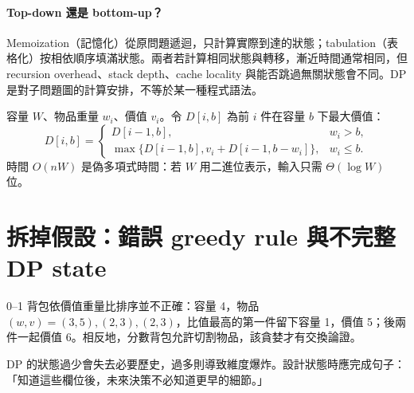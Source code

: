 \documentclass[11pt,a4paper,oneside,openany]{book}
\begin{document}
\paragraph{Top-down 還是 bottom-up？}
Memoization（記憶化）從原問題遞迴，只計算實際到達的狀態；tabulation（表格化）按相依順序填滿狀態。兩者若計算相同狀態與轉移，漸近時間通常相同，但 recursion overhead、stack depth、cache locality 與能否跳過無關狀態會不同。DP 是對子問題圖的計算安排，不等於某一種程式語法。

\begin{example}[0--1 背包]
容量 $W$、物品重量 $w_i$、價值 $v_i$。令 $D[i,b]$ 為前 $i$ 件在容量 $b$ 下最大價值：
\[
 D[i,b]=\begin{cases}
 D[i-1,b],&w_i>b,\\
 \max\{D[i-1,b],v_i+D[i-1,b-w_i]\},&w_i\le b.
 \end{cases}
\]
時間 $O(nW)$ 是偽多項式時間：若 $W$ 用二進位表示，輸入只需 $\Theta(\log W)$ 位。
\end{example}

\section{拆掉假設：錯誤 greedy rule 與不完整 DP state}
\begin{misconception}
0--1 背包依價值重量比排序並不正確：容量 4，物品 $(w,v)=(3,5),(2,3),(2,3)$，比值最高的第一件留下容量 1，價值 5；後兩件一起價值 6。相反地，分數背包允許切割物品，該貪婪才有交換論證。
\end{misconception}
DP 的狀態過少會失去必要歷史，過多則導致維度爆炸。設計狀態時應完成句子：「知道這些欄位後，未來決策不必知道更早的細節。」
\end{document}
